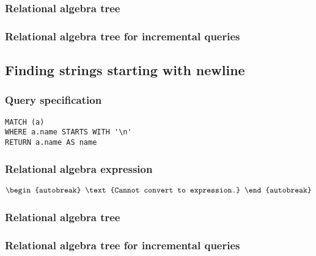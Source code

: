\subsubsection*{Relational algebra tree}


\subsubsection*{Relational algebra tree for incremental queries}


\subsection{Finding strings starting with newline}

\subsubsection*{Query specification}

\begin{lstlisting}
MATCH (a)
WHERE a.name STARTS WITH '\n'
RETURN a.name AS name
\end{lstlisting}

\subsubsection*{Relational algebra expression}

\begin{align*}
\begin{autobreak}
\text{Cannot convert to expression.}
\end{autobreak}
\end{align*}

\subsubsection*{Relational algebra tree}


\subsubsection*{Relational algebra tree for incremental queries}

